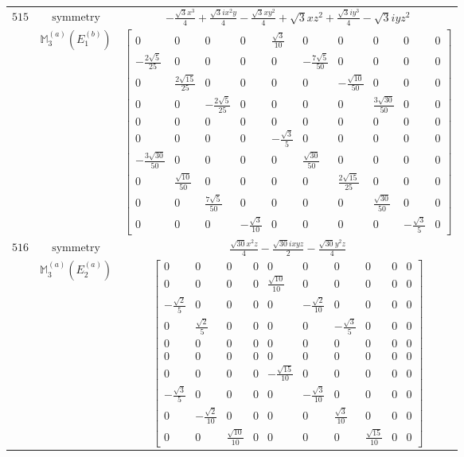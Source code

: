 \documentclass[fleqn,8pt,landscape]{jsarticle}
\begin{document}
\begin{longtable}{ccc}
$ 515 $ & $ \text{symmetry} $ & $ - \frac{\sqrt{3} x^{3}}{4} + \frac{\sqrt{3} i x^{2} y}{4} - \frac{\sqrt{3} x y^{2}}{4} + \sqrt{3} x z^{2} + \frac{\sqrt{3} i y^{3}}{4} - \sqrt{3} i y z^{2} $ \\
$  $ & $ \mathbb{M}_{3}^{(a)}(E_{1}^{(b)}) $ & $ \begin{bmatrix} 0 & 0 & 0 & 0 & \frac{\sqrt{3}}{10} & 0 & 0 & 0 & 0 & 0 \\ - \frac{2 \sqrt{5}}{25} & 0 & 0 & 0 & 0 & - \frac{7 \sqrt{5}}{50} & 0 & 0 & 0 & 0 \\ 0 & \frac{2 \sqrt{15}}{25} & 0 & 0 & 0 & 0 & - \frac{\sqrt{10}}{50} & 0 & 0 & 0 \\ 0 & 0 & - \frac{2 \sqrt{5}}{25} & 0 & 0 & 0 & 0 & \frac{3 \sqrt{30}}{50} & 0 & 0 \\ 0 & 0 & 0 & 0 & 0 & 0 & 0 & 0 & 0 & 0 \\ 0 & 0 & 0 & 0 & - \frac{\sqrt{3}}{5} & 0 & 0 & 0 & 0 & 0 \\ - \frac{3 \sqrt{30}}{50} & 0 & 0 & 0 & 0 & \frac{\sqrt{30}}{50} & 0 & 0 & 0 & 0 \\ 0 & \frac{\sqrt{10}}{50} & 0 & 0 & 0 & 0 & \frac{2 \sqrt{15}}{25} & 0 & 0 & 0 \\ 0 & 0 & \frac{7 \sqrt{5}}{50} & 0 & 0 & 0 & 0 & \frac{\sqrt{30}}{50} & 0 & 0 \\ 0 & 0 & 0 & - \frac{\sqrt{3}}{10} & 0 & 0 & 0 & 0 & - \frac{\sqrt{3}}{5} & 0 \end{bmatrix} $ \\ \hline
$ 516 $ & $ \text{symmetry} $ & $ \frac{\sqrt{30} x^{2} z}{4} - \frac{\sqrt{30} i x y z}{2} - \frac{\sqrt{30} y^{2} z}{4} $ \\
$  $ & $ \mathbb{M}_{3}^{(a)}(E_{2}^{(a)}) $ & $ \begin{bmatrix} 0 & 0 & 0 & 0 & 0 & 0 & 0 & 0 & 0 & 0 \\ 0 & 0 & 0 & 0 & \frac{\sqrt{10}}{10} & 0 & 0 & 0 & 0 & 0 \\ - \frac{\sqrt{2}}{5} & 0 & 0 & 0 & 0 & - \frac{\sqrt{2}}{10} & 0 & 0 & 0 & 0 \\ 0 & \frac{\sqrt{2}}{5} & 0 & 0 & 0 & 0 & - \frac{\sqrt{3}}{5} & 0 & 0 & 0 \\ 0 & 0 & 0 & 0 & 0 & 0 & 0 & 0 & 0 & 0 \\ 0 & 0 & 0 & 0 & 0 & 0 & 0 & 0 & 0 & 0 \\ 0 & 0 & 0 & 0 & - \frac{\sqrt{15}}{10} & 0 & 0 & 0 & 0 & 0 \\ - \frac{\sqrt{3}}{5} & 0 & 0 & 0 & 0 & - \frac{\sqrt{3}}{10} & 0 & 0 & 0 & 0 \\ 0 & - \frac{\sqrt{2}}{10} & 0 & 0 & 0 & 0 & \frac{\sqrt{3}}{10} & 0 & 0 & 0 \\ 0 & 0 & \frac{\sqrt{10}}{10} & 0 & 0 & 0 & 0 & \frac{\sqrt{15}}{10} & 0 & 0 \end{bmatrix} $ \\ \hline

\end{longtable}
\end{document}
